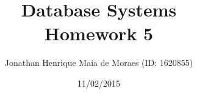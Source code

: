 \title{Database Systems \\ Homework 5}
\author{Jonathan Henrique Maia de Moraes (ID: 1620855)}
\date{11/02/2015}
\maketitle
